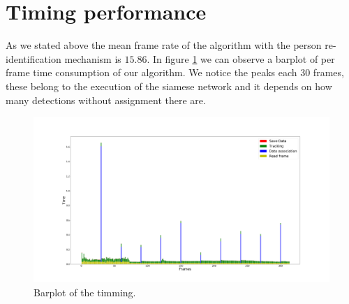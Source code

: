 \begin{table}[H]
\centering

\caption{Comparision with reidentification module.}
\label{tableResultsSiamee}
\end{table}


\section{Timing performance}\label{expeEVAL}



As we stated above the mean frame rate of the algorithm with the person re-identification mechanism is $15.86$. In figure \ref{timing1} we can observe a barplot of per frame time consumption of our algorithm.  We notice the peaks each $30$ frames, these belong to the execution of the siamese network and it depends on how many detections without assignment there are.

\begin{figure}[H]
\centering         
\includegraphics[width=0.9\linewidth]{graphicsRearrange/temps/timeGenral.png}
\caption{Barplot of the timming.} \label{timing1}
\end{figure}

